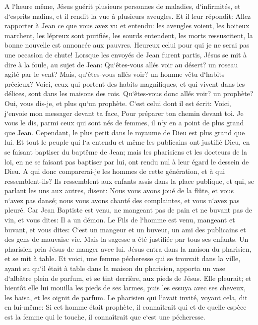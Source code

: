 \verse A l`heure même, Jésus guérit plusieurs personnes de maladies, d`infirmités, et d`esprits malins, et il rendit la vue à plusieurs aveugles. 
\verse Et il leur répondit: Allez rapporter à Jean ce que vous avez vu et entendu: les aveugles voient, les boiteux marchent, les lépreux sont purifiés, les sourds entendent, les morts ressuscitent, la bonne nouvelle est annoncée aux pauvres. 
\verse Heureux celui pour qui je ne serai pas une occasion de chute! 
\verse Lorsque les envoyés de Jean furent partis, Jésus se mit à dire à la foule, au sujet de Jean: Qu`êtes-vous allés voir au désert? un roseau agité par le vent? 
\verse Mais, qu`êtes-vous allés voir? un homme vêtu d`habits précieux? Voici, ceux qui portent des habits magnifiques, et qui vivent dans les délices, sont dans les maisons des rois. 
\verse Qu`êtes-vous donc allés voir? un prophète? Oui, vous dis-je, et plus qu`un prophète. 
\verse C`est celui dont il est écrit: Voici, j`envoie mon messager devant ta face, Pour préparer ton chemin devant toi. 
\verse Je vous le dis, parmi ceux qui sont nés de femmes, il n`y en a point de plus grand que Jean. Cependant, le plus petit dans le royaume de Dieu est plus grand que lui. 
\verse Et tout le peuple qui l`a entendu et même les publicains ont justifié Dieu, en se faisant baptiser du baptême de Jean; 
\verse mais les pharisiens et les docteurs de la loi, en ne se faisant pas baptiser par lui, ont rendu nul à leur égard le dessein de Dieu. 
\verse A qui donc comparerai-je les hommes de cette génération, et à qui ressemblent-ils? 
\verse Ils ressemblent aux enfants assis dans la place publique, et qui, se parlant les uns aux autres, disent: Nous vous avons joué de la flûte, et vous n`avez pas dansé; nous vous avons chanté des complaintes, et vous n`avez pas pleuré. 
\verse Car Jean Baptiste est venu, ne mangeant pas de pain et ne buvant pas de vin, et vous dites: Il a un démon. 
\verse Le Fils de l`homme est venu, mangeant et buvant, et vous dites: C`est un mangeur et un buveur, un ami des publicains et des gens de mauvaise vie. 
\verse Mais la sagesse a été justifiée par tous ses enfants. 
\verse Un pharisien pria Jésus de manger avec lui. Jésus entra dans la maison du pharisien, et se mit à table. 
\verse Et voici, une femme pécheresse qui se trouvait dans la ville, ayant su qu`il était à table dans la maison du pharisien, apporta un vase d`albâtre plein de parfum, 
\verse et se tint derrière, aux pieds de Jésus. Elle pleurait; et bientôt elle lui mouilla les pieds de ses larmes, puis les essuya avec ses cheveux, les baisa, et les oignit de parfum. 
\verse Le pharisien qui l`avait invité, voyant cela, dit en lui-même: Si cet homme était prophète, il connaîtrait qui et de quelle espèce est la femme qui le touche, il connaîtrait que c`est une pécheresse. 
